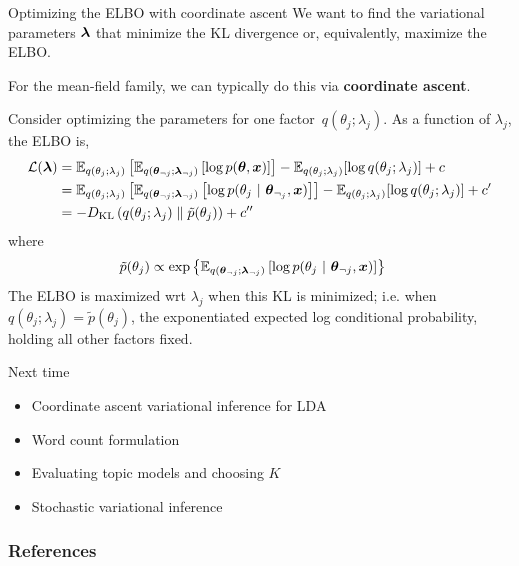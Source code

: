 \documentclass[aspectratio=169]{beamer}
\begin{document}
\begin{frame}{Optimizing the ELBO with coordinate ascent}
We want to find the variational parameters $\boldsymbol{\lambda}$ that minimize the KL divergence or, equivalently, maximize the ELBO.

For the mean-field family, we can typically do this via \textbf{coordinate ascent}. 

Consider optimizing the parameters for one factor~$q(\theta_j; \lambda_j)$. As a function of $\lambda_j$, the ELBO is,
\begin{align}
    \mathcal{L}(\boldsymbol{\lambda}) 
    &= 
    \mathbb{E}_{q(\theta_j; \lambda_j)}\left[ \mathbb{E}_{q(\boldsymbol{\theta}_{\neg j}; \boldsymbol{\lambda}_{\neg j})} \left[ \log p(\boldsymbol{\theta}, \boldsymbol{x}) \right] \right] -
    \mathbb{E}_{q(\theta_j; \lambda_j)}[\log q(\theta_j; \lambda_j)] + c \\
    &= 
    \mathbb{E}_{q(\theta_j; \lambda_j)}\left[ \mathbb{E}_{q(\boldsymbol{\theta}_{\neg j}; \boldsymbol{\lambda}_{\neg j})} \left[ \log p(\theta_j ~\vert~ \boldsymbol{\theta}_{\neg_j}, \boldsymbol{x}) \right] \right] -
    \mathbb{E}_{q(\theta_j; \lambda_j)}[\log q(\theta_j; \lambda_j)] + c' \\
    &= -D_{\textrm{KL}}\left(q(\theta_j; \lambda_j)\;\|\;\tilde{p}(\theta_j)\right) + c''
\end{align}
where 
\begin{align}
    \tilde{p}(\theta_j) &\propto
    \exp \left\{ \mathbb{E}_{q(\boldsymbol{\theta}_{\neg j}; \boldsymbol{\lambda}_{\neg j})} \left[ \log p(\theta_j ~\vert~ \boldsymbol{\theta}_{\neg j}, \boldsymbol{x}) \right] \right\}
\end{align}
The ELBO is maximized wrt $\lambda_j$ when this KL is minimized; i.e. when $q(\theta_j ; \lambda_j) = \tilde{p}(\theta_j)$, the exponentiated expected log conditional probability, holding all other factors fixed.
\end{frame}

\begin{frame}{Next time}
    
    \begin{itemize}
        \item Coordinate ascent variational inference for LDA
        \item Word count formulation
        \item Evaluating topic models and choosing $K$
        \item Stochastic variational inference
    \end{itemize}
\end{frame}

\begin{frame}[t,allowframebreaks]
        \frametitle{References}
        
        
\end{frame}
\end{document}
